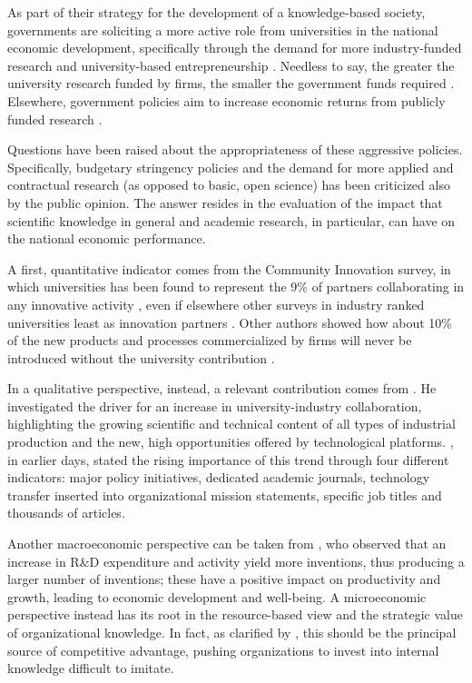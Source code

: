 As part of their strategy for the development of a knowledge-based society, governments are soliciting a more active role from universities in the national economic development, specifically through the demand for more industry-funded research \citep{Geuna2009} and university-based entrepreneurship \citep{OShea2004}. Needless to say, the greater the university research funded by firms, the smaller the government funds required \citep{Yusuf2008}. Elsewhere, government policies aim to increase economic returns from publicly funded research \citep{Bercovitz2006}.

Questions have been raised about the appropriateness of these aggressive policies. Specifically, budgetary stringency policies and the demand for more applied and contractual research (as opposed to basic, open science) has been criticized also by the public opinion. The answer resides in the evaluation of the impact that scientific knowledge in general and academic research, in particular, can have on the national economic performance.

A first, quantitative indicator comes from the Community Innovation survey, in which universities has been found to represent the 9\% of partners collaborating in any innovative activity \citep{Muscio2008}, even if elsewhere other surveys in industry ranked universities least as innovation partners \citep{Yusuf2008}. Other authors showed how about 10\% of the new products and processes commercialized by firms will never be introduced without the university contribution \citep{Bekkers2008}. 

In a qualitative perspective, instead, a relevant contribution comes from \citet{Bercovitz2006}. He investigated the driver for an increase in university-industry collaboration, highlighting the growing scientific and technical content of all types of industrial production and the new, high opportunities offered by technological platforms. \citet{Bozeman2000}, in earlier days, stated the rising importance of this trend through four different indicators: major policy initiatives, dedicated academic journals, technology transfer inserted into organizational mission statements, specific job titles and thousands of articles. 

Another macroeconomic perspective can be taken from \citet{Markman2005}, who observed that an increase in R\&D expenditure and activity yield more inventions, thus producing a larger number of inventions; these have a positive impact on productivity and growth, leading to economic development and well-being. A microeconomic perspective instead has its root in the resource-based view \citep{Wernerfelt1984} and the strategic value of organizational knowledge. In fact, as clarified by \citet{Argote2000}, this should be the principal source of competitive advantage, pushing organizations to invest into internal knowledge difficult to imitate.

